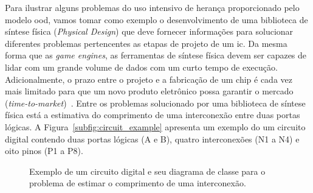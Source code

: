 Para ilustrar alguns problemas do uso intensivo de herança proporcionado pelo modelo \ac{ood}, vamos tomar como exemplo o desenvolvimento de uma biblioteca de síntese física (\textit{Physical Design}) que deve fornecer informações para  solucionar diferentes problemas pertencentes as etapas de projeto de um \ac{ic}. 
Da mesma forma que as \textit{game engines}, as ferramentas de síntese física devem ser capazes de lidar com um grande volume de dados com um curto tempo de execução.
Adicionalmente, o prazo entre o projeto e a fabricação de um chip é cada vez mais limitado para que um novo produto eletrônico possa garantir o mercado (\textit{time-to-market})~\cite{papa2011physical}.
Entre os problemas solucionado por uma biblioteca de síntese física está a estimativa do comprimento de uma interconexão entre duas portas lógicas.
A Figura~\ref{subfig:circuit_example} apresenta um exemplo do um circuito digital contendo duas portas lógicas (A e B), quatro interconexões (N1 a N4) e oito pinos (P1 a P8).

\begin{figure}[ht]
    \centering
    
    \hspace{0.5cm}
    \caption[Exemplo de um circuito digital]{Exemplo de um circuito digital e seu diagrama de classe para o problema de estimar o comprimento de uma interconexão.}
    \label{fig:circuit_example}
\end{figure}

